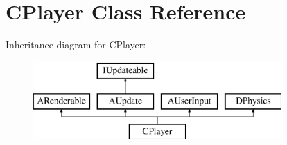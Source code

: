 \hypertarget{classCPlayer}{\section{C\-Player Class Reference}
\label{classCPlayer}
}
Inheritance diagram for C\-Player\-:\begin{figure}[H]
\begin{center}
\leavevmode
\includegraphics[height=3.000000cm]{classCPlayer}
\end{center}
\end{figure}
